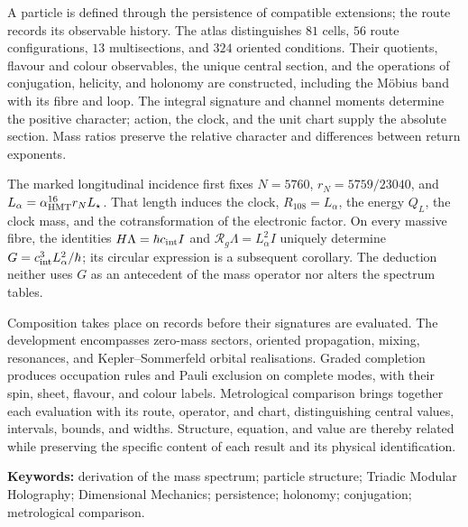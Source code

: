 A particle is defined through the persistence of compatible extensions;
the route records its observable history. The atlas distinguishes \(81\)
cells, \(56\) route configurations, \(13\) multisections, and \(324\) oriented
conditions. Their quotients, flavour and colour observables, the unique
central section, and the operations of conjugation, helicity, and holonomy
are constructed, including the Möbius band with its fibre and loop. The
integral signature and channel moments determine the positive character;
action, the clock, and the unit chart supply the absolute section. Mass
ratios preserve the relative character and differences between return
exponents.

The marked longitudinal incidence first fixes
\(N=5760\), \(r_N=5759/23040\), and
\(L_\alpha=\alpha_{\rm HMT}^{16}r_NL_\star\). That length induces the
clock, \(R_{108}=L_\alpha\), the energy \(Q_L\), the clock mass, and the
cotransformation of the electronic factor. On every massive fibre, the
identities \(H\Lambda=\hbar c_{\rm int}I\) and
\(\mathcal R_g\Lambda=L_\alpha^2I\) uniquely determine
\(G=c_{\rm int}^3L_\alpha^2/\hbar\); its circular expression is a
subsequent corollary. The deduction neither uses \(G\) as an antecedent
of the mass operator nor alters the spectrum tables.

Composition takes place on records before their signatures are evaluated.
The development encompasses zero-mass sectors, oriented propagation,
mixing, resonances, and Kepler--Sommerfeld orbital realisations. Graded
completion produces occupation rules and Pauli exclusion on complete
modes, with their spin, sheet, flavour, and colour labels. Metrological
comparison brings together each evaluation with its route, operator,
and chart, distinguishing central values, intervals, bounds, and widths.
Structure, equation, and value are thereby related while preserving the
specific content of each result and its physical identification.

\noindent\textbf{Keywords:} derivation of the mass spectrum; particle
structure; Triadic Modular Holography; Dimensional Mechanics; persistence;
holonomy; conjugation; metrological comparison.
\par\endgroup
